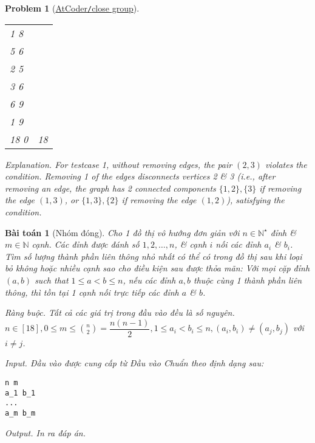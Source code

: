 \documentclass{article}
\newtheorem{baitoan}{Bài toán}
\newtheorem{problem}{Problem}
\begin{document}
\begin{problem}[\href{https://atcoder.jp/contests/abc187/tasks/abc187_f}{AtCoder{\tt/}close group}]
\begin{table}[H]
\begin{tabular}{|l|l|}
            1 8 & \\
            5 6 & \\
            2 5 & \\
            3 6 & \\
            6 9 & \\
            1 9 & \\
            \hline
            18 0 & 18 \\
            \hline
        \end{tabular}
    \end{table}
    \item {\sf Explanation.} For testcase 1, without removing edges, the pair $(2,3)$ violates the condition. Removing 1 of the edges disconnects vertices 2 \& 3 (i.e., after removing an edge, the graph has 2 connected components $\{1,2\},\{3\}$ if removing the edge $(1,3)$, or $\{1,3\},\{2\}$ if removing the edge $(1,2)$), satisfying the condition.
\end{problem}

\begin{baitoan}[Nhóm đóng]
    Cho 1 đồ thị vô hướng đơn giản với $n\in\mathbb{N}^\star$ đỉnh \& $m\in\mathbb{N}$ cạnh. Các đỉnh được đánh số $1, 2, \ldots, n$, \& cạnh $i$ nối các đỉnh $a_i$ \& $b_i$. Tìm số lượng thành phần liên thông nhỏ nhất có thể có trong đồ thị sau khi loại bỏ không hoặc nhiều cạnh sao cho điều kiện sau được thỏa mãn: Với mọi cặp đỉnh $(a,b)$ such that $1\le a < b \le n$, nếu các đỉnh $a,b$ thuộc cùng 1 thành phần liên thông, thì tồn tại 1 cạnh nối trực tiếp các đỉnh $a$ \& $b$.
    \item {\sf Ràng buộc.} Tất cả các giá trị trong đầu vào đều là số nguyên. $n\in[18],0\le m\le\binom{n}{2} =\dfrac{n(n - 1)}{2},1\le a_i < b_i\le n,(a_i,b_i)\ne(a_j,b_j)$ với $i\ne j$.
    \item {\sf Input.} Đầu vào được cung cấp từ Đầu vào Chuẩn theo định dạng sau:
    \begin{verbatim}
n m
a_1 b_1
...
a_m b_m
    \end{verbatim}
    \item {\sf Output.} In ra đáp án.
\end{baitoan}
\end{document}
